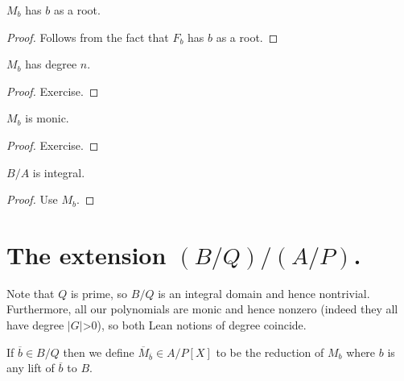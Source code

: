 \begin{lemma}
  \label{MulSemiringAction.CharacteristicPolynomial.M_eval_eq_zero}
  $M_b$ has $b$ as a root.
\end{lemma}
\begin{proof} Follows from the fact that $F_b$ has $b$ as a root.
\end{proof}
\begin{lemma}
  \label{MulSemiringAction.CharacteristicPolynomial.M_deg}
  $M_b$ has degree $n$.
\end{lemma}
\begin{proof} Exercise.
\end{proof}
\begin{lemma}
  \label{MulSemiringAction.CharacteristicPolynomial.M_monic}
  $M_b$ is monic.
\end{lemma}
\begin{proof}
  Exercise.
\end{proof}

\begin{theorem}
  \label{MulSemiringAction.CharacteristicPolynomial.isIntegral}
  $B/A$ is integral.
\end{theorem}
\begin{proof} Use $M_b$.
\end{proof}

\section{The extension $(B/Q)/(A/P)$.}

Note that $Q$ is prime, so $B/Q$ is an integral domain and hence nontrivial.
Furthermore, all our polynomials are monic and hence nonzero (indeed they
all have degree $|G|$>0), so both Lean notions of degree coincide.

\begin{definition}
  \label{MulSemiringAction.CharacteristicPolynomial.Mbar}
  \leanok
  If $\overline{b}\in B/Q$ then we define $\overline{M}_{\overline{b}}\in A/P[X]$
  to be the reduction of $M_b$ where $b$ is any lift of $\overline{b}$ to $B$.
\end{definition}

